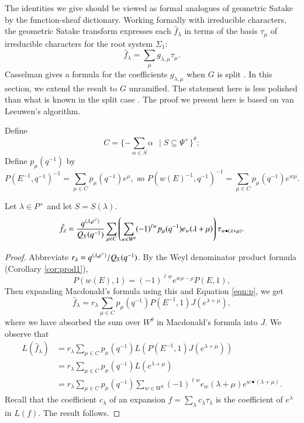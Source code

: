 The identities
we give should be viewed as formal analogues of geometric Satake
by the function-sheaf dictionary. %
Working formally with irreducible characters,
the geometric Satake transform expresses each $\hat f_\lambda$ in terms of the basis $\tau_\mu$ of irreducible
characters for the root system $\Sigma_1$:
\begin{equation}\label{eqn:geometric-satake}
\hat f_\lambda = \sum_\mu g_{\lambda,\mu} \tau_\mu.
\end{equation}
Casselman gives a formula for the coefficients $g_{\lambda,\mu}$ 
when $G$ is split \cite{casymmetric}.
In this section, we  extend the result to $G$ unramified.
The statement here is less polished than what is known in the split case \cite{casymmetric}.
The proof we present here is based on van Leeuwen's algorithm.



Define
\[
C = \{  - \sum_{\alpha\in S}\alpha \ \ \mid S \subseteq \Psi^+ \}^\theta;
\]
Define $p_\mu(q^{-1})$ by
\begin{equation}\label{eqn:p}
 P(E^{-1},q^{-1})^{-1} = \sum_{\mu\in C} p_\mu(q^{-1}) e^{\mu},
\text{\ \ so }  P(w(E)^{-1},q^{-1})^{-1} = \sum_{\mu\in C} p_\mu(q^{-1}) e^{w\mu}.
\end{equation}


\begin{theorem}  Let $\lambda\in P^+$ and let $S=S(\lambda)$.
\[
\hat f_\lambda = \frac{q^{\langle{\lambda,\rho^\vee}\rangle}}{Q_S(q^{-1})} 
\sum_{\mu\in C}\left(\sum_{w\in W^\theta} (-1)^{\ell w} p_{\mu}(q^{-1}) e_w(\lambda+\mu)\right)  \tau_{w\bullet(\lambda+\mu)}.
\]
\end{theorem}


\begin{proof}
Abbreviate $r_\lambda = q^{\langle{\lambda,\rho^\vee}\rangle}/Q_S(q^{-1})$.
By the Weyl denominator product formula (Corollary \ref{cor:prod1}),
\begin{equation}
P(w(E),1) = (-1)^{\ell w} e^{w\rho - \rho} P(E,1),
\end{equation}
Then expanding Macdonald's formula using this and Equation \ref{eqn:p}, we get
\[
\hat f_\lambda = r_\lambda \sum_{\mu\in C} p_\mu(q^{-1}) P(E^{-1},1) J (e^{\lambda+\mu}),
\]
where we have absorbed the sum over $W^\theta$ in Macdonald's formula into $J$.
We observe that 
\begin{align*}
L(\hat f_\lambda) &= r_\lambda \sum_{\mu\in C} p_\mu(q^{-1}) L(P(E^{-1},1) J(e^{\lambda+\mu})) \\
&= 
r_\lambda \sum_{\mu\in C} p_\mu(q^{-1}) L(e^{\lambda+\mu}) \\
&= 
r_\lambda
\sum_{\mu\in C} p_\mu(q^{-1}) \sum_{w\in W^\theta} (-1)^{\ell w} e_w(\lambda+\mu) e^{w\bullet (\lambda+\mu)}.
\end{align*}
Recall that the coefficient $c_\lambda$ of an expansion $f = \sum_\lambda c_\lambda\tau_\lambda$ 
is the coefficient of $e^\lambda$ in $L(f)$.  The result follows.
\end{proof}

